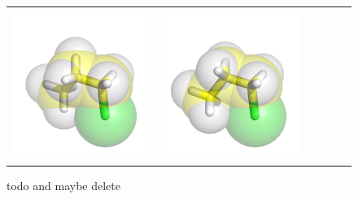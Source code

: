 \documentclass{svmult}
\begin{document}
\begin{figure}
\begin{tabular}{cccccc}
\includegraphics[width=\tmpa]{fig/m003-010} & 
\includegraphics[width=\tmpa]{fig/m003-011} \\

\end{tabular}
\caption{todo and maybe delete}
\end{figure}
\end{document}
